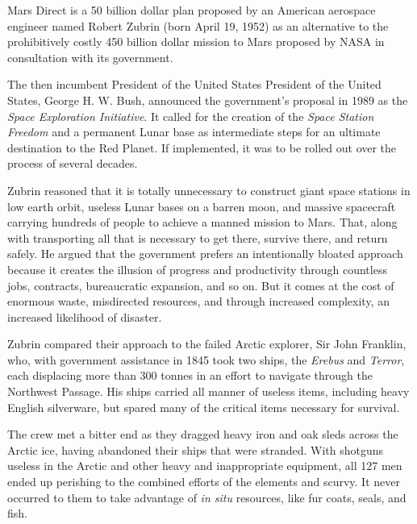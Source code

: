 Mars Direct is a \type{$}50 billion dollar plan proposed by an American aerospace engineer named Robert Zubrin (born April 19, 1952) as an alternative to the prohibitively costly \type{$}450 billion dollar mission to Mars proposed by NASA in consultation with its government.

The then incumbent President of the United States President of the United States, George H. W. Bush, announced the government's proposal in 1989 as the {\it Space Exploration Initiative}. It called for the creation of the {\it Space Station Freedom} and a permanent Lunar base as intermediate steps for an ultimate destination to the Red Planet. If implemented, it was to be rolled out over the process of several decades.

Zubrin reasoned that it is totally unnecessary to construct giant space stations in low earth orbit, useless Lunar bases on a barren moon, and massive spacecraft carrying hundreds of people to achieve a manned mission to Mars. That, along with transporting all that is necessary to get there, survive there, and return safely. He argued that the government prefers an intentionally bloated approach because it creates the illusion of progress and productivity through countless jobs, contracts, bureaucratic expansion, and so on. But it comes at the cost of enormous waste, misdirected resources, and through increased complexity, an increased likelihood of disaster.

Zubrin compared their approach to the failed Arctic explorer, Sir John Franklin, who, with government assistance in 1845 took two ships, the {\it Erebus} and {\it Terror}, each displacing more than 300 tonnes in an effort to navigate through the Northwest Passage. His ships carried all manner of useless items, including heavy English silverware, but spared many of the critical items necessary for survival. 

The crew met a bitter end as they dragged heavy iron and oak sleds across the Arctic ice, having abandoned their ships that were stranded. With shotguns useless in the Arctic and other heavy and inappropriate equipment, all 127 men ended up perishing to the combined efforts of the elements and scurvy. It never occurred to them to take advantage of {\it in situ} resources, like fur coats, seals, and fish.

